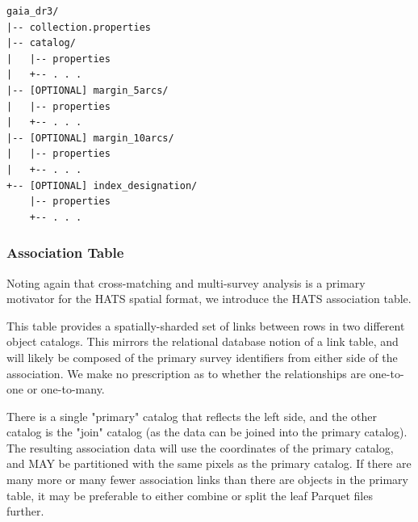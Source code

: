 \documentclass[11pt,a4paper]{ivoa}
\begin{document}
\begin{minipage}{\linewidth}
\begin{lstlisting}[caption=Example collection directory contents, label=fig:exampleCollectionStructure]
gaia_dr3/
|-- collection.properties
|-- catalog/
|   |-- properties
|   +-- . . .
|-- [OPTIONAL] margin_5arcs/
|   |-- properties
|   +-- . . .
|-- [OPTIONAL] margin_10arcs/
|   |-- properties
|   +-- . . .
+-- [OPTIONAL] index_designation/
    |-- properties
    +-- . . .
\end{lstlisting}
\end{minipage}

\subsubsection{Association Table} \label{sec:association}

Noting again that cross-matching and multi-survey analysis is a primary motivator for the HATS spatial format, we introduce the HATS association table. 

This table provides a spatially-sharded set of links between rows in two different object catalogs. 
This mirrors the relational database notion of a link table, and will likely be composed of the primary survey identifiers from either side of the association.
We make no prescription as to whether the relationships are one-to-one or one-to-many. \par

There is a single "primary" catalog that reflects the left side, and the other catalog is the "join" catalog (as the data can be joined into the primary catalog).
The resulting association data will use the coordinates of the primary catalog, and MAY be partitioned with the same pixels as the primary catalog.
If there are many more or many fewer association links than there are objects in the primary table, it may be preferable to either combine or split the leaf Parquet files further.

\end{document}
